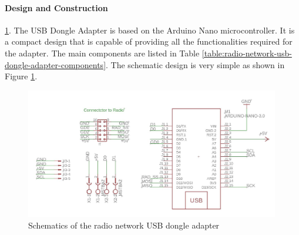 \paragraph{Design and Construction} \ref{fig:schematic-radio-network-usb-dongle-adapter}.
The USB Dongle Adapter is based on the Arduino Nano microcontroller. It is a compact design that is capable of providing all the functionalities required for the adapter. The main components are listed in Table \ref{table:radio-network-usb-dongle-adapter-components}. The schematic design is very simple as shown in Figure \ref{fig:schematic-radio-network-usb-dongle-adapter}.


\begin{figure}[h]
    \centering
    \includegraphics[width=0.99\textwidth]{images/05/image72.jpg}
    \caption{Schematics of the radio network USB dongle adapter}
    \label{fig:schematic-radio-network-usb-dongle-adapter}
\end{figure}


